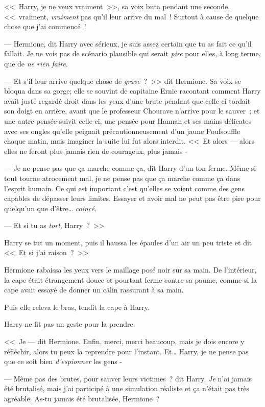 <<~Harry, je ne veux vraiment~>>, sa voix buta pendant une seconde, <<~vraiment, \emph{vraiment} pas qu'il leur arrive du mal~! Surtout à cause de quelque chose que j'ai commencé~!

--- Hermione, dit Harry avec sérieux, je suis assez certain que tu as fait ce qu'il fallait. Je ne vois pas de scénario plausible qui serait \emph{pire} pour elles, à long terme, que de \emph{ne rien faire}.

--- Et s'il leur arrive quelque chose de \emph{grave}~?~>> dit Hermione. Sa voix se bloqua dans sa gorge; elle se souvint de capitaine Ernie racontant comment Harry avait juste regardé droit dans les yeux d'une brute pendant que celle-ci tordait son doigt en arrière, avant que le professeur Chourave n'arrive pour le sauver~; et une autre pensée suivit celle-ci, une pensée pour Hannah et ses mains délicates avec ses ongles qu'elle peignait précautionneusement d'un jaune Poufsouffle chaque matin, mais imaginer la suite lui fut alors interdit. <<~Et alors — alors elles ne feront plus jamais rien de courageux, plus jamais -

--- Je ne pense pas que ça marche comme ça, dit Harry d'un ton ferme. Même si tout tourne atrocement mal, je ne pense pas que ça marche comme ça dans l'esprit humain. Ce qui est important c'est qu'elles se voient comme des gens capables de dépasser leurs limites. Essayer et avoir mal ne peut pas être pire pour quelqu'un que d'être… \emph{coincé}.

--- Et si tu as \emph{tort}, Harry~?~>>

Harry se tut un moment, puis il haussa les épaules d'un air un peu triste et dit <<~Et si j'ai raison~?~>>

Hermione rabaissa les yeux vers le maillage posé noir sur sa main. De l'intérieur, la cape était étrangement douce et pourtant ferme contre sa paume, comme si la cape avait essayé de donner un câlin rassurant à sa main.

Puis elle releva le bras, tendit la cape à Harry.

Harry ne fit pas un geste pour la prendre.

<<~Je — dit Hermione. Enfin, merci, merci beaucoup, mais je dois encore y réfléchir, alors tu peux la reprendre pour l'instant. Et… Harry, je ne pense pas que ce soit bien \emph{d'espionner} les gens -

--- Même pas des brutes, pour sauver leurs victimes~? dit Harry. \emph{Je} n'ai jamais été brutalisé, mais j'ai participé à une simulation réaliste et ça n'était pas très agréable. As-tu jamais été brutalisée, Hermione~?

